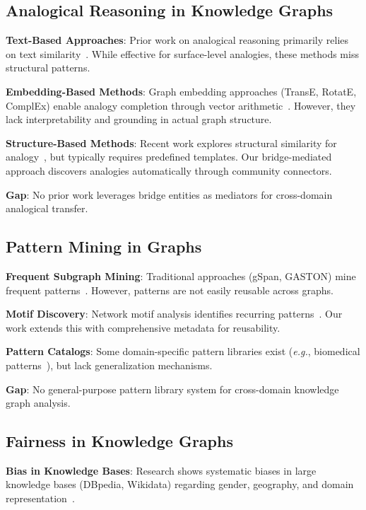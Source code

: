 \documentclass[11pt,twocolumn]{article}
\newcommand{\eg}{\emph{e.g.}}
\begin{document}
\subsection{Analogical Reasoning in Knowledge Graphs}

\textbf{Text-Based Approaches}: Prior work on analogical reasoning primarily relies on text similarity~\cite{gentner1983structure,mikolov2013distributed}. While effective for surface-level analogies, these methods miss structural patterns.

\textbf{Embedding-Based Methods}: Graph embedding approaches (TransE, RotatE, ComplEx) enable analogy completion through vector arithmetic~\cite{bordes2013translating,sun2019rotate}. However, they lack interpretability and grounding in actual graph structure.

\textbf{Structure-Based Methods}: Recent work explores structural similarity for analogy~\cite{yan2005mining}, but typically requires predefined templates. Our bridge-mediated approach discovers analogies automatically through community connectors.

\textbf{Gap}: No prior work leverages bridge entities as mediators for cross-domain analogical transfer.

\subsection{Pattern Mining in Graphs}

\textbf{Frequent Subgraph Mining}: Traditional approaches (gSpan, GASTON) mine frequent patterns~\cite{yan2002gspan,nijssen2004quickstart}. However, patterns are not easily reusable across graphs.

\textbf{Motif Discovery}: Network motif analysis identifies recurring patterns~\cite{milo2002network,przulj2004modeling}. Our work extends this with comprehensive metadata for reusability.

\textbf{Pattern Catalogs}: Some domain-specific pattern libraries exist (\eg, biomedical patterns~\cite{himmelstein2017systematic}), but lack generalization mechanisms.

\textbf{Gap}: No general-purpose pattern library system for cross-domain knowledge graph analysis.

\subsection{Fairness in Knowledge Graphs}

\textbf{Bias in Knowledge Bases}: Research shows systematic biases in large knowledge bases (DBpedia, Wikidata) regarding gender, geography, and domain representation~\cite{bolukbasi2016man,garg2018word}.
\end{document}
